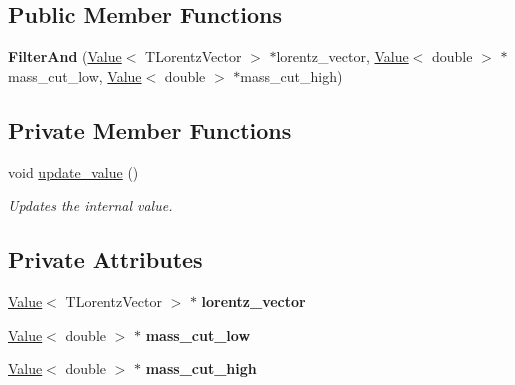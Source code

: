 \subsection*{Public Member Functions}
\begin{DoxyCompactItemize}
\item 
\hypertarget{classfv_1_1root_1_1MassFilter_a99ffbe18e200cce7d7cb9d1a82f826f3}{}\label{classfv_1_1root_1_1MassFilter_a99ffbe18e200cce7d7cb9d1a82f826f3} 
{\bfseries Filter\+And} (\hyperlink{classfv_1_1Value}{Value}$<$ T\+Lorentz\+Vector $>$ $\ast$lorentz\+\_\+vector, \hyperlink{classfv_1_1Value}{Value}$<$ double $>$ $\ast$mass\+\_\+cut\+\_\+low, \hyperlink{classfv_1_1Value}{Value}$<$ double $>$ $\ast$mass\+\_\+cut\+\_\+high)
\end{DoxyCompactItemize}
\subsection*{Private Member Functions}
\begin{DoxyCompactItemize}
\item 
void \hyperlink{classfv_1_1root_1_1MassFilter_a1a8b086086e1220bc352523184d3f1c2}{update\+\_\+value} ()
\begin{DoxyCompactList}\small\item\em Updates the internal value. \end{DoxyCompactList}\end{DoxyCompactItemize}
\subsection*{Private Attributes}
\begin{DoxyCompactItemize}
\item 
\hypertarget{classfv_1_1root_1_1MassFilter_a1cdeeb2e4de77e232a5d95a029400769}{}\label{classfv_1_1root_1_1MassFilter_a1cdeeb2e4de77e232a5d95a029400769} 
\hyperlink{classfv_1_1Value}{Value}$<$ T\+Lorentz\+Vector $>$ $\ast$ {\bfseries lorentz\+\_\+vector}
\item 
\hypertarget{classfv_1_1root_1_1MassFilter_aad31c2a2d2d20f9b33702e16955e7155}{}\label{classfv_1_1root_1_1MassFilter_aad31c2a2d2d20f9b33702e16955e7155} 
\hyperlink{classfv_1_1Value}{Value}$<$ double $>$ $\ast$ {\bfseries mass\+\_\+cut\+\_\+low}
\item 
\hypertarget{classfv_1_1root_1_1MassFilter_a98d45df130776b649ed4a70a8f5c8fb3}{}\label{classfv_1_1root_1_1MassFilter_a98d45df130776b649ed4a70a8f5c8fb3} 
\hyperlink{classfv_1_1Value}{Value}$<$ double $>$ $\ast$ {\bfseries mass\+\_\+cut\+\_\+high}
\end{DoxyCompactItemize}
